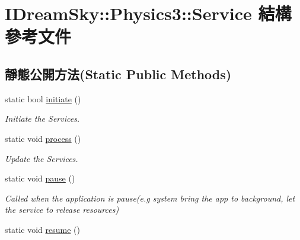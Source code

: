 \hypertarget{struct_i_dream_sky_1_1_physics3_1_1_service}{}\section{I\+Dream\+Sky\+:\+:Physics3\+:\+:Service 結構 參考文件}
\label{struct_i_dream_sky_1_1_physics3_1_1_service}
\subsection*{靜態公開方法(Static Public Methods)}
\begin{DoxyCompactItemize}
\item 
static bool \hyperlink{struct_i_dream_sky_1_1_physics3_1_1_service_a141c8719c7806f23f5ecb276c24ff654}{initiate} ()
\begin{DoxyCompactList}\small\item\em Initiate the Services. \end{DoxyCompactList}\item 
static void \hyperlink{struct_i_dream_sky_1_1_physics3_1_1_service_a9d7138b73e6923e0f3c1179cb570cf53}{process} ()\hypertarget{struct_i_dream_sky_1_1_physics3_1_1_service_a9d7138b73e6923e0f3c1179cb570cf53}{}\label{struct_i_dream_sky_1_1_physics3_1_1_service_a9d7138b73e6923e0f3c1179cb570cf53}

\begin{DoxyCompactList}\small\item\em Update the Services. \end{DoxyCompactList}\item 
static void \hyperlink{struct_i_dream_sky_1_1_physics3_1_1_service_ab7278ae6339db626a5f683ce34bae501}{pause} ()\hypertarget{struct_i_dream_sky_1_1_physics3_1_1_service_ab7278ae6339db626a5f683ce34bae501}{}\label{struct_i_dream_sky_1_1_physics3_1_1_service_ab7278ae6339db626a5f683ce34bae501}

\begin{DoxyCompactList}\small\item\em Called when the application is pause(e.\+g system bring the app to background, let the service to release resources) \end{DoxyCompactList}\item 
static void \hyperlink{struct_i_dream_sky_1_1_physics3_1_1_service_a9368b43f676786492e04a460ccb36241}{resume} ()\hypertarget{struct_i_dream_sky_1_1_physics3_1_1_service_a9368b43f676786492e04a460ccb36241}{}\label{struct_i_dream_sky_1_1_physics3_1_1_service_a9368b43f676786492e04a460ccb36241}


\end{DoxyCompactItemize}
